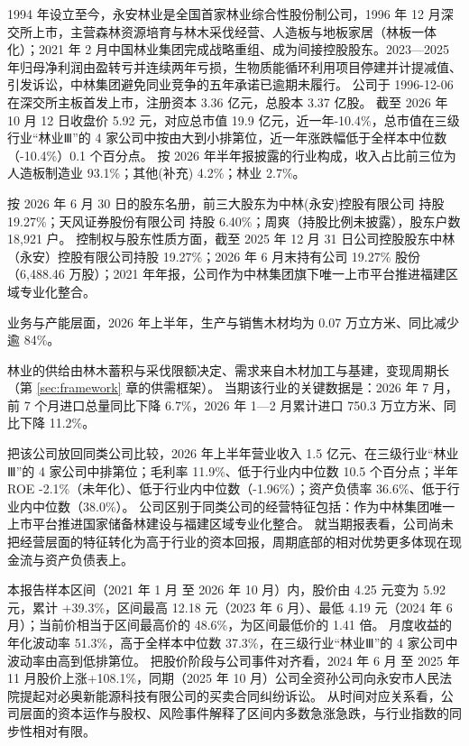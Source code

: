 1994 年设立至今，永安林业是全国首家林业综合性股份制公司，1996 年 12 月深交所上市，主营森林资源培育与林木采伐经营、人造板与地板家居（林板一体化）；2021 年 2 月中国林业集团完成战略重组、成为间接控股股东。2023—2025 年归母净利润由盈转亏并连续两年亏损，生物质能循环利用项目停建并计提减值、引发诉讼，中林集团避免同业竞争的五年承诺已逾期未履行。 公司于 1996-12-06 在深交所主板首发上市，注册资本 3.36 亿元，总股本 3.37 亿股。 截至 2026 年 10 月 12 日收盘价 5.92 元，对应总市值 19.9 亿元，近一年-10.4\%，总市值在三级行业“林业Ⅲ”的 4 家公司中按由大到小排第位，近一年涨跌幅低于全样本中位数（-10.4\%）0.1 个百分点。 按 2026 年半年报披露的行业构成，收入占比前三位为人造板制造业 93.1\%；其他(补充) 4.2\%；林业 2.7\%。

 按 2026 年 6 月 30 日的股东名册，前三大股东为中林(永安)控股有限公司 持股 19.27\%；天风证券股份有限公司 持股 6.40\%；周爽（持股比例未披露），股东户数 18,921 户。 控制权与股东性质方面，截至 2025 年 12 月 31 日公司控股股东中林（永安）控股有限公司持股 19.27\%；2026 年 6 月末持有公司 19.27\% 股份（6,488.46 万股）；2021 年年报，公司作为中林集团旗下唯一上市平台推进福建区域专业化整合。

 业务与产能层面，2026 年上半年，生产与销售木材均为 0.07 万立方米、同比减少逾 84\%。

 林业的供给由林木蓄积与采伐限额决定、需求来自木材加工与基建，变现周期长（第 \ref{sec:framework} 章的供需框架）。 当期该行业的关键数据是：2026 年 7 月，前 7 个月进口总量同比下降 6.7\%，2026 年 1—2 月累计进口 750.3 万立方米、同比下降 11.2\%。

 把该公司放回同类公司比较，2026 年上半年营业收入 1.5 亿元、在三级行业“林业Ⅲ”的 4 家公司中排第位；毛利率 11.9\%、低于行业内中位数 10.5 个百分点；半年 ROE -2.1\%（未年化）、低于行业内中位数（-1.96\%）；资产负债率 36.6\%、低于行业内中位数（38.0\%）。 公司区别于同类公司的经营特征包括：作为中林集团唯一上市平台推进国家储备林建设与福建区域专业化整合。 就当期报表看，公司尚未把经营层面的特征转化为高于行业的资本回报，周期底部的相对优势更多体现在现金流与资产负债表上。

 本报告样本区间（2021 年 1 月 至 2026 年 10 月）内，股价由 4.25 元变为 5.92 元，累计 +39.3\%，区间最高 12.18 元（2023 年 6 月）、最低 4.19 元（2024 年 6 月）；当前价相当于区间最高价的 48.6\%，为区间最低价的 1.41 倍。 月度收益的年化波动率 51.3\%，高于全样本中位数 37.3\%，在三级行业“林业Ⅲ”的 4 家公司中波动率由高到低排第位。 把股价阶段与公司事件对齐看，2024 年 6 月 至 2025 年 11 月股价上涨+108.1\%，同期（2025 年 10 月）公司全资孙公司向永安市人民法院提起对必奥新能源科技有限公司的买卖合同纠纷诉讼。 从时间对应关系看，公司层面的资本运作与股权、风险事件解释了区间内多数急涨急跌，与行业指数的同步性相对有限。

